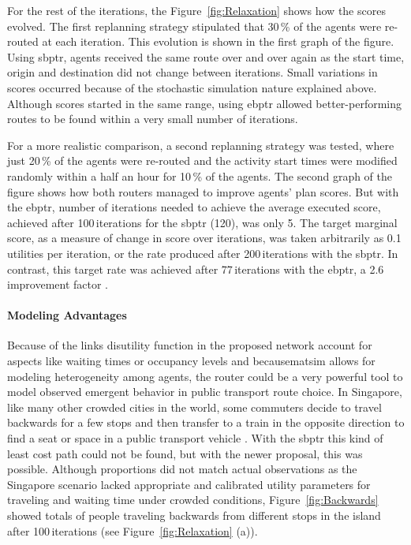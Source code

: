 For the rest of the iterations, the Figure~\ref{fig:Relaxation} shows how the scores evolved. The first replanning strategy stipulated that 30\,\% of the agents were re-routed at each iteration. This evolution is shown in the first graph of the figure. Using \gls{sbptr}, agents received the same route over and over again as the start time, origin and destination did not change between iterations. Small variations in scores occurred because of the stochastic simulation nature explained above. Although scores started in the same range, using \gls{ebptr} allowed better-performing routes to be found within a very small number of iterations.

For a more realistic comparison, a second replanning strategy was tested, where just 20\,\% of the agents were re-routed and the activity start times were modified randomly within a half an hour for 10\,\% of the agents. The second graph of the figure shows how both routers managed to improve agents' plan scores. But with the \gls{ebptr}, number of iterations needed to achieve the average executed score, achieved after 100\,iterations for the \gls{sbptr} (120), was only 5. The target marginal score, as a measure of change in score over iterations, was taken arbitrarily as 0.1\,utilities per iteration, or the rate produced after 200\,iterations with the \gls{sbptr}. In contrast, this target rate was achieved after 77\,iterations with the \gls{ebptr}, a 2.6 improvement factor .

\paragraph{Modeling Advantages}

Because of the links disutility function in the proposed network account for aspects like waiting times or occupancy levels and because\gls{matsim} allows for modeling heterogeneity among agents, the router could be a very powerful tool to model observed emergent behavior in public transport route choice. In Singapore, like many other crowded cities in the world, some commuters decide to travel backwards for a few stops and then transfer to a train in the opposite direction to find a seat or space in a public transport vehicle \cite{ChakirovErath_HKSTS_2011}. With the \gls{sbptr} this kind of least cost path could not be found, but with the newer proposal, this was possible. Although proportions did not match actual observations as the Singapore scenario lacked appropriate and calibrated utility parameters for traveling and waiting time under crowded conditions, Figure~\ref{fig:Backwards} showed totals of people traveling backwards from different stops in the island after 100\,iterations (see Figure~\ref{fig:Relaxation} (a)).

